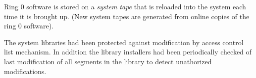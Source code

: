 Ring 0 software is stored on a \textit{system tape} that is reloaded into the system each time it is brought up.
(New system tapes are generated from online copies of the ring 0 software).

The system libraries had been protected against modification by access control list mechanism. In addition 
the library installers had been periodically checked of last modification of all segments in the library to
detect unathorized modifications.